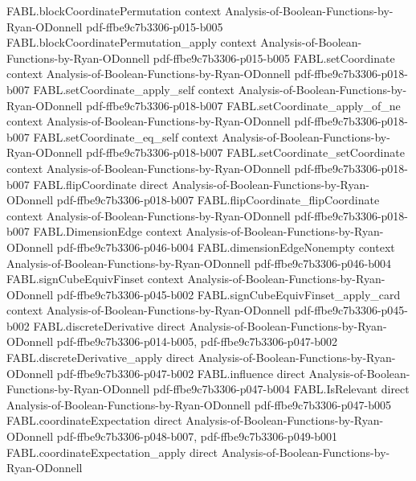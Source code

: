 \begin{theorem}
\proofstep
  {FABL.blockCoordinatePermutation}
  {context}
  {Analysis-of-Boolean-Functions-by-Ryan-ODonnell}
  {pdf-ffbe9c7b3306-p015-b005}
\proofstep
  {FABL.blockCoordinatePermutation_apply}
  {context}
  {Analysis-of-Boolean-Functions-by-Ryan-ODonnell}
  {pdf-ffbe9c7b3306-p015-b005}
\proofstep
  {FABL.setCoordinate}
  {context}
  {Analysis-of-Boolean-Functions-by-Ryan-ODonnell}
  {pdf-ffbe9c7b3306-p018-b007}
\proofstep
  {FABL.setCoordinate_apply_self}
  {context}
  {Analysis-of-Boolean-Functions-by-Ryan-ODonnell}
  {pdf-ffbe9c7b3306-p018-b007}
\proofstep
  {FABL.setCoordinate_apply_of_ne}
  {context}
  {Analysis-of-Boolean-Functions-by-Ryan-ODonnell}
  {pdf-ffbe9c7b3306-p018-b007}
\proofstep
  {FABL.setCoordinate_eq_self}
  {context}
  {Analysis-of-Boolean-Functions-by-Ryan-ODonnell}
  {pdf-ffbe9c7b3306-p018-b007}
\proofstep
  {FABL.setCoordinate_setCoordinate}
  {context}
  {Analysis-of-Boolean-Functions-by-Ryan-ODonnell}
  {pdf-ffbe9c7b3306-p018-b007}
\proofstep
  {FABL.flipCoordinate}
  {direct}
  {Analysis-of-Boolean-Functions-by-Ryan-ODonnell}
  {pdf-ffbe9c7b3306-p018-b007}
\proofstep
  {FABL.flipCoordinate_flipCoordinate}
  {context}
  {Analysis-of-Boolean-Functions-by-Ryan-ODonnell}
  {pdf-ffbe9c7b3306-p018-b007}
\proofstep
  {FABL.DimensionEdge}
  {context}
  {Analysis-of-Boolean-Functions-by-Ryan-ODonnell}
  {pdf-ffbe9c7b3306-p046-b004}
\proofstep
  {FABL.dimensionEdgeNonempty}
  {context}
  {Analysis-of-Boolean-Functions-by-Ryan-ODonnell}
  {pdf-ffbe9c7b3306-p046-b004}
\proofstep
  {FABL.signCubeEquivFinset}
  {context}
  {Analysis-of-Boolean-Functions-by-Ryan-ODonnell}
  {pdf-ffbe9c7b3306-p045-b002}
\proofstep
  {FABL.signCubeEquivFinset_apply_card}
  {context}
  {Analysis-of-Boolean-Functions-by-Ryan-ODonnell}
  {pdf-ffbe9c7b3306-p045-b002}
\proofstep
  {FABL.discreteDerivative}
  {direct}
  {Analysis-of-Boolean-Functions-by-Ryan-ODonnell}
  {pdf-ffbe9c7b3306-p014-b005,
    pdf-ffbe9c7b3306-p047-b002}
\proofstep
  {FABL.discreteDerivative_apply}
  {direct}
  {Analysis-of-Boolean-Functions-by-Ryan-ODonnell}
  {pdf-ffbe9c7b3306-p047-b002}
\proofstep
  {FABL.influence}
  {direct}
  {Analysis-of-Boolean-Functions-by-Ryan-ODonnell}
  {pdf-ffbe9c7b3306-p047-b004}
\proofstep
  {FABL.IsRelevant}
  {direct}
  {Analysis-of-Boolean-Functions-by-Ryan-ODonnell}
  {pdf-ffbe9c7b3306-p047-b005}
\proofstep
  {FABL.coordinateExpectation}
  {direct}
  {Analysis-of-Boolean-Functions-by-Ryan-ODonnell}
  {pdf-ffbe9c7b3306-p048-b007,
    pdf-ffbe9c7b3306-p049-b001}
\proofstep
  {FABL.coordinateExpectation_apply}
  {direct}
  {Analysis-of-Boolean-Functions-by-Ryan-ODonnell}

\end{theorem}
